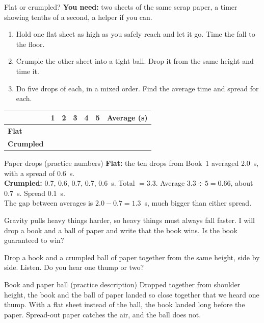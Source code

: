 \begin{tryit}{Flat or crumpled?}
\textbf{You need:} two sheets of the same scrap paper, a timer showing tenths of a second, a helper if you can.
\begin{enumerate}[leftmargin=1.6em]
\item Hold one flat sheet as high as you safely reach and let it go. Time the fall to the floor.
\item Crumple the other sheet into a tight ball. Drop it from the same height and time it.
\item Do five drops of each, in a mixed order. Find the average time and spread for each.
\end{enumerate}
\par\medskip
\renewcommand{\arraystretch}{1.6}
\begin{tabular}{|l|c|c|c|c|c|c|}
\hline
 & \textbf{1} & \textbf{2} & \textbf{3} & \textbf{4} & \textbf{5} & \textbf{Average (s)}\\ \hline
\textbf{Flat} & & & & & & \\ \hline
\textbf{Crumpled} & & & & & & \\ \hline
\end{tabular}
\end{tryit}

\begin{worked}{Paper drops (practice numbers)}
\textbf{Flat:} the ten drops from Book~1 averaged 2.0~s, with a spread of 0.6~s.\\
\textbf{Crumpled:} 0.7, 0.6, 0.7, 0.7, 0.6~s. Total $=3.3$. Average $3.3\div5=0.66$, about 0.7~s. Spread $0.1$~s.\\
The gap between averages is $2.0-0.7=1.3$~s, much bigger than either spread.
\end{worked}

\begin{multix}[hmm]\multixbot[hmm]\tcblower
Gravity pulls heavy things harder, so heavy things must always fall faster. I will drop a book and a ball of paper and write that the book wins. Is the book guaranteed to win?
\end{multix}

Drop a book and a crumpled ball of paper together from the same height, side by side. Listen. Do you hear one thump or two?

\begin{worked}{Book and paper ball (practice description)}
Dropped together from shoulder height, the book and the ball of paper landed so close together that we heard one thump. With a flat sheet instead of the ball, the book landed long before the paper. Spread-out paper catches the air, and the ball does not.
\end{worked}

